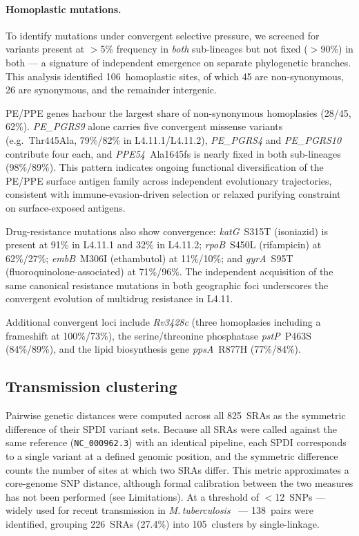 \documentclass[11pt,a4paper]{article}
\newcommand{\spdi}[1]{\texttt{#1}}
\newcommand{\lignee}[1]{\textsf{#1}}
\begin{document}
\paragraph{Homoplastic mutations.}

\begin{sloppypar}
To identify mutations under convergent selective pressure, we screened
for variants present at $>$5\% frequency in \emph{both} sub-lineages
but not fixed ($>$90\%) in both --- a signature of independent emergence
on separate phylogenetic branches.  This analysis identified
106~homoplastic sites, of which 45 are non-synonymous, 26 are
synonymous, and the remainder intergenic.

PE/PPE genes harbour the largest share of non-synonymous homoplasies
(28/45, 62\%).  \textit{PE\_PGRS9} alone carries five convergent
missense variants (e.g.\ Thr445Ala, 79\%/82\% in \lignee{L4.11.1}/\lignee{L4.11.2}),
\textit{PE\_PGRS4} and \textit{PE\_PGRS10} contribute four each, and
\textit{PPE54}~Ala1645fs is nearly fixed in both sub-lineages
(98\%/89\%).  This pattern indicates ongoing functional
diversification of the PE/PPE surface antigen family across independent
evolutionary trajectories, consistent with immune-evasion-driven
selection or relaxed purifying constraint on surface-exposed antigens.
\end{sloppypar}

Drug-resistance mutations also show convergence: \textit{katG}~S315T
(isoniazid) is present at 91\% in \lignee{L4.11.1} and 32\% in
\lignee{L4.11.2}; \textit{rpoB}~S450L (rifampicin) at 62\%/27\%;
\textit{embB}~M306I (ethambutol) at 11\%/10\%; and \textit{gyrA}~S95T
(fluoroquinolone-associated) at 71\%/96\%.  The independent acquisition
of the same canonical resistance mutations in both geographic foci
underscores the convergent evolution of multidrug resistance in \lignee{L4.11}.

Additional convergent loci include \textit{Rv3428c} (three homoplasies
including a frameshift at 100\%/73\%), the serine/threonine phosphatase
\textit{pstP}~P463S (84\%/89\%), and the lipid biosynthesis gene
\textit{ppsA}~R877H (77\%/84\%).

\subsection{Transmission clustering}

Pairwise genetic distances were computed across all 825~SRAs as the
symmetric difference of their SPDI variant sets.  Because all SRAs were
called against the same reference (\spdi{NC\_000962.3}) with an identical
pipeline, each SPDI corresponds to a single variant at a defined genomic
position, and the symmetric difference counts the number of sites at
which two SRAs differ.  This metric approximates a core-genome SNP
distance, although formal calibration between the two measures has not
been performed (see Limitations).  At a threshold of
$<$12~SNPs --- widely used for recent transmission in
\textit{M.\,tuberculosis}~\cite{walker2013} --- 138~pairs were identified, grouping
226~SRAs (27.4\%) into 105~clusters by single-linkage.
\end{document}

